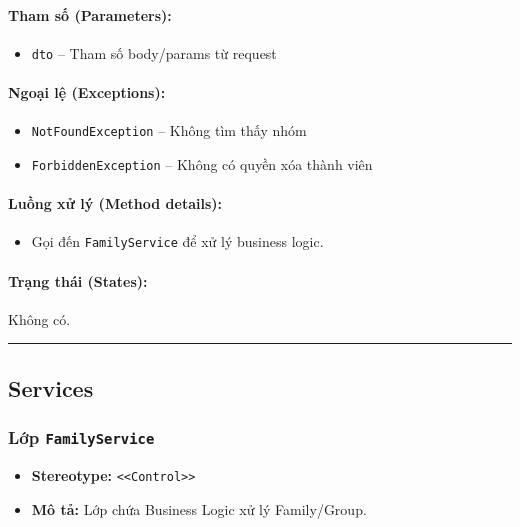 \documentclass[12pt,a4paper]{article}
\begin{document}
\paragraph{Tham số (Parameters):}
\begin{itemize}[leftmargin=*]
    \item \texttt{dto} – Tham số body/params từ request
\end{itemize}


\paragraph{Ngoại lệ (Exceptions):}
\begin{itemize}[leftmargin=*]
    \item \texttt{NotFoundException} – Không tìm thấy nhóm
    \item \texttt{ForbiddenException} – Không có quyền xóa thành viên
\end{itemize}


\paragraph{Luồng xử lý (Method details):}
\begin{itemize}[leftmargin=*]
    \item Gọi đến \texttt{FamilyService} để xử lý business logic.
\end{itemize}


\paragraph{Trạng thái (States):}
Không có.

\vskip 0.5cm
\noindent\rule{\textwidth}{0.5pt}
\vskip 0.5cm

\subsection{Services}

\subsubsection{Lớp \texttt{FamilyService}}
\begin{itemize}[leftmargin=*]
    \item \textbf{Stereotype:} \texttt{\textless{}\textless{}Control\textgreater{}\textgreater{}}
    \item \textbf{Mô tả:} Lớp chứa Business Logic xử lý Family/Group.
\end{itemize}
\end{document}
